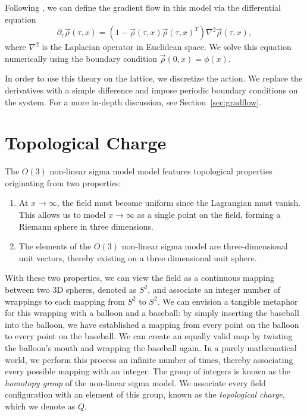 \documentclass[12pt]{report}
\begin{document}
Following \cite{bietenholz2018}, we can define the gradient flow in this model via the differential equation
\begin{equation}
    \label{eq:nsm_gradflow}
    \partial_\tau \vec\rho (\tau,x) = \left( 1 - \vec\rho(\tau,x) \vec\rho(\tau,x)^T \right) \nabla^2 \vec\rho(\tau,x),
\end{equation}
where $\nabla^2$ is the Laplacian operator in Euclidean space. We solve this equation numerically using the boundary condition $\vec\rho(0,x) = \phi(x)$.

In order to use this theory on the lattice, we discretize the action. We replace the derivatives with a simple difference and impose periodic boundary conditions on the system. For a more in-depth discussion, see Section~\ref{sec:gradflow}.

\section{Topological Charge}

The $O(3)$ non-linear sigma model model features topological properties originating from two properties: 
\begin{enumerate}
    \item At $x\rightarrow\infty$, the field must become uniform since the Lagrangian must vanish. This allows us to model $x\rightarrow\infty$ as a single point on the field, forming a Riemann sphere in three dimensions.
    \item The elements of the $O(3)$ non-linear sigma model are three-dimensional unit vectors, thereby existing on a three dimensional unit sphere. 
\end{enumerate}

With these two properties, we can view the field as a continuous mapping between two 3D spheres, denoted as $S^2$, and associate an integer number of wrappings to each mapping from $S^2$ to $S^2$. We can envision a tangible metaphor for this wrapping with a balloon and a baseball: by simply inserting the baseball into the balloon, we have established a mapping from every point on the balloon to every point on the baseball. We can create an equally valid map by twisting the balloon's mouth and wrapping the baseball again. In a purely mathematical world, we perform this process an infinite number of times, thereby associating every possible mapping with an integer. The group of integers is known as the \textit{homotopy group} of the non-linear sigma model. We associate every field configuration with an element of this group, known as the \textit{topological charge}, which we denote as $Q$.
\end{document}
